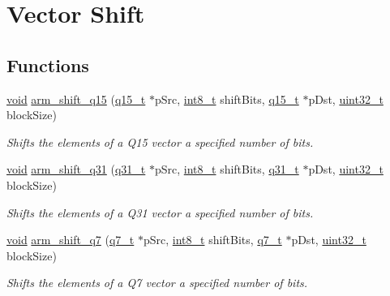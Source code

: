 \hypertarget{group__shift}{\section{Vector Shift}
\label{group__shift}
}
\subsection*{Functions}
\begin{DoxyCompactItemize}
\item 
\hyperlink{group___n_a_m_e_ga18028b8badbf1ea7e704ccac3c488e82}{void} \hyperlink{group__shift_gaa1757e53279780107acc92cf100adb61}{arm\-\_\-shift\-\_\-q15} (\hyperlink{arm__math_8h_ab5a8fb21a5b3b983d5f54f31614052ea}{q15\-\_\-t} $\ast$p\-Src, \hyperlink{stdint_8h_ad566f6541e98b74246db1a3a3a85ad49}{int8\-\_\-t} shift\-Bits, \hyperlink{arm__math_8h_ab5a8fb21a5b3b983d5f54f31614052ea}{q15\-\_\-t} $\ast$p\-Dst, \hyperlink{stdint_8h_a435d1572bf3f880d55459d9805097f62}{uint32\-\_\-t} block\-Size)
\begin{DoxyCompactList}\small\item\em Shifts the elements of a Q15 vector a specified number of bits. \end{DoxyCompactList}\item 
\hyperlink{group___n_a_m_e_ga18028b8badbf1ea7e704ccac3c488e82}{void} \hyperlink{group__shift_ga387dd8b7b87377378280978f16cdb13d}{arm\-\_\-shift\-\_\-q31} (\hyperlink{arm__math_8h_adc89a3547f5324b7b3b95adec3806bc0}{q31\-\_\-t} $\ast$p\-Src, \hyperlink{stdint_8h_ad566f6541e98b74246db1a3a3a85ad49}{int8\-\_\-t} shift\-Bits, \hyperlink{arm__math_8h_adc89a3547f5324b7b3b95adec3806bc0}{q31\-\_\-t} $\ast$p\-Dst, \hyperlink{stdint_8h_a435d1572bf3f880d55459d9805097f62}{uint32\-\_\-t} block\-Size)
\begin{DoxyCompactList}\small\item\em Shifts the elements of a Q31 vector a specified number of bits. \end{DoxyCompactList}\item 
\hyperlink{group___n_a_m_e_ga18028b8badbf1ea7e704ccac3c488e82}{void} \hyperlink{group__shift_ga47295d08a685f7de700a48dafb4db6fb}{arm\-\_\-shift\-\_\-q7} (\hyperlink{arm__math_8h_ae541b6f232c305361e9b416fc9eed263}{q7\-\_\-t} $\ast$p\-Src, \hyperlink{stdint_8h_ad566f6541e98b74246db1a3a3a85ad49}{int8\-\_\-t} shift\-Bits, \hyperlink{arm__math_8h_ae541b6f232c305361e9b416fc9eed263}{q7\-\_\-t} $\ast$p\-Dst, \hyperlink{stdint_8h_a435d1572bf3f880d55459d9805097f62}{uint32\-\_\-t} block\-Size)
\begin{DoxyCompactList}\small\item\em Shifts the elements of a Q7 vector a specified number of bits. \end{DoxyCompactList}\end{DoxyCompactItemize}


